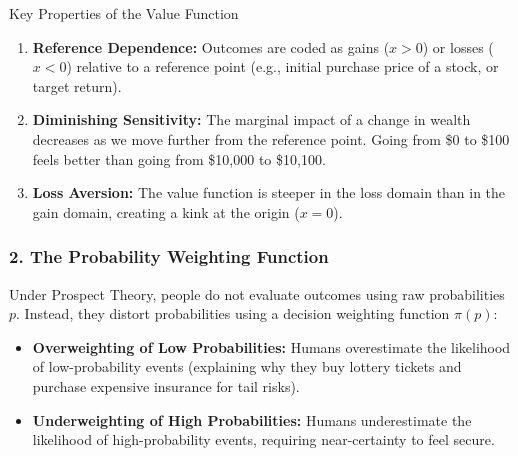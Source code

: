 \documentclass[11pt,a4paper]{article}
\begin{document}
\begin{academicbox}{Key Properties of the Value Function}
\begin{enumerate}
    \item \textbf{Reference Dependence:} Outcomes are coded as gains ($x > 0$) or losses ($x < 0$) relative to a reference point (e.g., initial purchase price of a stock, or target return).
    \item \textbf{Diminishing Sensitivity:} The marginal impact of a change in wealth decreases as we move further from the reference point. Going from \$0 to \$100 feels better than going from \$10,000 to \$10,100.
    \item \textbf{Loss Aversion:} The value function is steeper in the loss domain than in the gain domain, creating a kink at the origin ($x=0$).
\end{enumerate}
\end{academicbox}

\subsubsection{2. The Probability Weighting Function}
Under Prospect Theory, people do not evaluate outcomes using raw probabilities $p$. Instead, they distort probabilities using a decision weighting function $\pi(p)$:
\begin{itemize}
    \item \textbf{Overweighting of Low Probabilities:} Humans overestimate the likelihood of low-probability events (explaining why they buy lottery tickets and purchase expensive insurance for tail risks).
    \item \textbf{Underweighting of High Probabilities:} Humans underestimate the likelihood of high-probability events, requiring near-certainty to feel secure.
\end{itemize}
\end{document}
